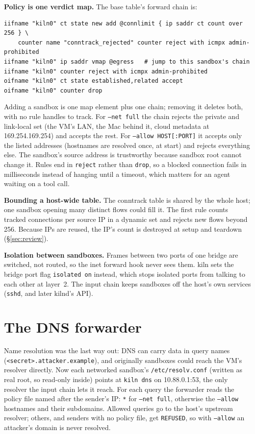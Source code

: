 \documentclass[10pt,letterpaper]{article}
\newcommand{\code}[1]{\texttt{#1}}
\begin{document}
\textbf{Policy is one verdict map.} The base table's forward chain is:
\begin{lstlisting}
iifname "kiln0" ct state new add @connlimit { ip saddr ct count over 256 } \
    counter name "conntrack_rejected" counter reject with icmpx admin-prohibited
iifname "kiln0" ip saddr vmap @egress   # jump to this sandbox's chain
iifname "kiln0" counter reject with icmpx admin-prohibited
oifname "kiln0" ct state established,related accept
oifname "kiln0" counter drop
\end{lstlisting}
Adding a sandbox is one map element plus one chain; removing it deletes both, with
no rule handles to track. For \code{--net full} the chain rejects the private
and link-local set (the VM's LAN, the Mac behind it, cloud metadata at
169.254.169.254) and accepts the rest. For \code{--allow HOST[:PORT]} it accepts
only the listed addresses (hostnames are resolved once, at start) and rejects
everything else. The sandbox's source address is trustworthy because sandbox root
cannot change it. Rules end in \code{reject} rather than \code{drop}, so a blocked
connection fails in milliseconds instead of hanging until a timeout, which matters
for an agent waiting on a tool call.

\textbf{Bounding a host-wide table.} The conntrack table is shared by the whole
host; one sandbox opening many distinct flows could fill it. The first rule
counts tracked connections per source IP in a dynamic set and rejects new flows
beyond 256. Because IPs are reused, the IP's count is destroyed at setup and
teardown (\S\ref{sec:review}).

\textbf{Isolation between sandboxes.} Frames between two ports of one bridge are
switched, not routed, so the inet forward hook never sees them. kiln sets the
bridge port flag \code{isolated on} instead, which stops isolated ports from
talking to each other at layer~2. The input chain keeps sandboxes off the host's
own services (\code{sshd}, and later kilnd's API).

\section{The DNS forwarder}

Name resolution was the last way out: DNS can carry data in query names
(\code{<secret>.attacker.example}), and originally sandboxes could reach the VM's
resolver directly. Now each networked sandbox's \code{/etc/resolv.conf} (written
as real root, so read-only inside) points at \code{kiln dns} on 10.88.0.1:53, the
only resolver the input chain lets it reach. For each query the forwarder reads
the policy file named after the sender's IP: \code{*} for \code{--net full},
otherwise the \code{--allow} hostnames and their subdomains. Allowed queries go
to the host's upstream resolver; others, and senders with no policy file, get
\code{REFUSED}, so with \code{--allow} an attacker's domain is never resolved.
\end{document}
